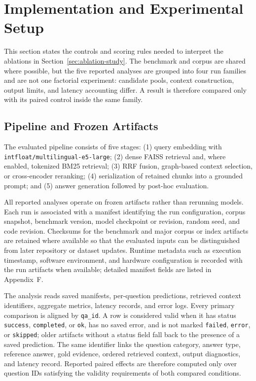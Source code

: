 \section{Implementation and Experimental Setup}
\label{sec:implementation-setup}

This section states the controls and scoring rules needed to interpret the
ablations in Section~\ref{sec:ablation-study}. The benchmark and corpus are
shared where possible, but the five reported analyses are grouped into four
run families and are not one factorial experiment: candidate pools, context
construction, output limits, and latency accounting differ. A result is
therefore compared only with its paired control inside the same family.

\subsection{Pipeline and Frozen Artifacts}
\label{sec:software-architecture}

The evaluated pipeline consists of five stages: (1) query embedding with \texttt{intfloat/multilingual-e5-large};
(2) dense FAISS retrieval and, where enabled, tokenized BM25 retrieval;
(3) RRF fusion, graph-based context selection, or cross-encoder reranking;
(4) serialization of retained chunks into a grounded prompt;
and (5) answer generation followed by post-hoc evaluation.

All reported analyses operate on frozen artifacts rather than rerunning models.
Each run is associated with a manifest identifying the run configuration, 
corpus snapshot, benchmark version, model checkpoint or revision, random seed, and code revision.
Checksums for the benchmark and major corpus or index artifacts are retained where available 
so that the evaluated inputs can be distinguished from later repository or dataset updates.
Runtime metadata such as execution timestamp, software environment, and hardware configuration is recorded with the run artifacts when available; detailed manifest fields are listed in Appendix~F.

The analysis reads saved manifests, per-question predictions, retrieved context identifiers, aggregate metrics, latency records, and error logs.
Every primary comparison is aligned by \texttt{qa\_id}. A row is considered valid when it has status \texttt{success}, \texttt{completed}, or \texttt{ok}, has no saved error, and is not marked \texttt{failed}, \texttt{error}, or \texttt{skipped}; older artifacts without a status field fall back to the presence of a saved prediction.
The same identifier links the question category, answer type, reference answer, gold evidence, ordered retrieved context, output diagnostics, and latency record.
Reported paired effects are therefore computed only over question IDs satisfying the validity requirements of both compared conditions.

